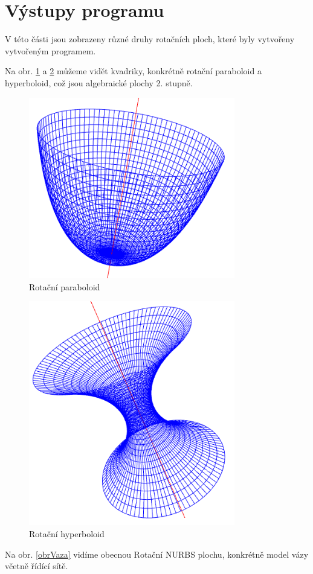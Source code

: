 \clearpage
\section{Výstupy programu}\label{vystupy}
V této části jsou zobrazeny různé druhy rotačních ploch, které byly vytvořeny vytvořeným programem.

Na obr. \ref{obrParab} a \ref{obrHyperb} můžeme vidět kvadriky, konkrétně rotační paraboloid a hyperboloid, což jsou algebraické plochy 2. stupně.

\begin{figure}[!h]
	\begin{center}
		\includegraphics*[width=9cm]{obr/paraboloid}
	\end{center}
	\caption{Rotační paraboloid}
	\label{obrParab}
\end{figure}
\begin{figure}[!h]
\begin{center}
	\includegraphics*[width=9cm]{obr/hyperboloid}
\end{center}
\caption{Rotační hyperboloid}
\label{obrHyperb}
\end{figure}
\clearpage
Na obr. \ref{obrVaza} vidíme obecnou Rotační NURBS plochu, konkrétně model vázy včetně řídící sítě.

